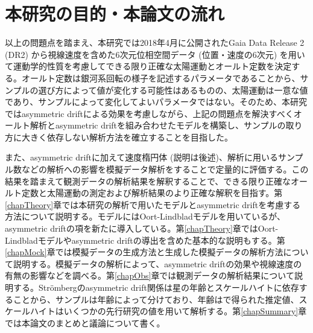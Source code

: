 \section{本研究の目的・本論文の流れ}



以上の問題点を踏まえ、本研究では2018年4月に公開されたGaia Data Release 2 (DR2) から視線速度を含めた6次元位相空間データ (位置・速度の6次元) を用いて運動学的性質を考慮してできる限り正確な太陽運動とオールト定数を決定する。オールト定数は銀河系回転の様子を記述するパラメータであることから、サンプルの選び方によって値が変化する可能性はあるものの、太陽運動は一意な値であり、サンプルによって変化してよいパラメータではない。そのため、本研究ではasymmetric driftによる効果を考慮しながら、上記の問題点を解決すべくオールト解析とasymmetric driftを組み合わせたモデルを構築し、サンプルの取り方に大きく依存しない解析方法を確立することを目指した。

また、asymmetric driftに加えて速度楕円体 (説明は後述)、解析に用いるサンプル数などの解析への影響を模擬データ解析をすることで定量的に評価する。この結果を踏まえて観測データの解析結果を解釈することで、できる限り正確なオールト定数と太陽運動の測定および解析結果のより正確な解釈を目指す。第\ref{chapTheory}章では本研究の解析で用いたモデルとasymmetric driftを考慮する方法について説明する。モデルにはOort-Lindbladモデルを用いているが、asymmetric driftの項を新たに導入している。第\ref{chapTheory}章ではOort-Lindbladモデルやasymmetric driftの導出を含めた基本的な説明もする。第\ref{chapMock}章では模擬データの生成方法と生成した模擬データの解析方法について説明する。模擬データの解析によって、asymmetric driftの効果や視線速度の有無の影響などを調べる。第\ref{chapObs}章では観測データの解析結果について説明する。Str\"{o}mbergのasymmetric drift関係は星の年齢とスケールハイトに依存することから、サンプルは年齢によって分けており、年齢は\cite{SD18}で得られた推定値、スケールハイトはいくつかの先行研究の値を用いて解析する。第\ref{chapSummary}章では本論文のまとめと議論について書く。

